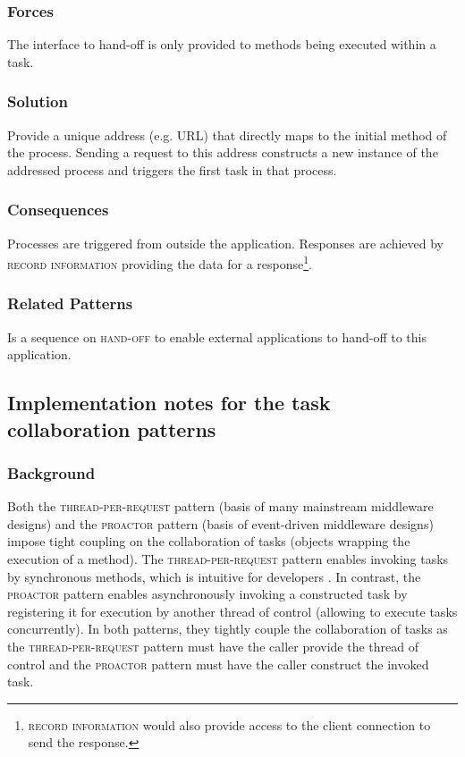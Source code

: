 \documentclass[prodmode]{style/acmlarge}
\begin{document}
\subsubsection*{Forces} The interface to hand-off is only provided to methods
being executed within a task.

\subsubsection*{Solution} Provide a unique address (e.g. URL) that directly maps
to the initial method of the process.  Sending a request to this address
constructs a new instance of the addressed process and triggers the first task
in that process.

\subsubsection*{Consequences} Processes are triggered from outside the
application. Responses are achieved by \textsc{record information} providing the
data for a response\footnote{\textsc{record information} would also provide
access to the client connection to send the response.}.

\subsubsection*{Related Patterns} Is a sequence on \textsc{hand-off} to enable
external applications to hand-off to this application.



\subsection{Implementation notes for the task collaboration patterns}

\subsubsection*{Background}

Both the \textsc{thread-per-request} pattern \cite{thread-per-request} (basis of
many mainstream middleware designs) and the \textsc{proactor} pattern
\cite{proactor} (basis of event-driven middleware designs) impose tight
coupling on the collaboration of tasks (objects wrapping the execution of a
method).  The \textsc{thread-per-request} pattern enables invoking tasks by
synchronous methods, which is intuitive for developers \cite{proactor}.
In contrast, the \textsc{proactor} pattern enables asynchronously invoking a
constructed task by registering it for execution by another thread of control
(allowing to execute tasks concurrently).  In both patterns, they tightly couple
the collaboration of tasks as the \textsc{thread-per-request} pattern must have
the caller provide the thread of control and the \textsc{proactor} pattern must
have the caller construct the invoked task.
\end{document}
